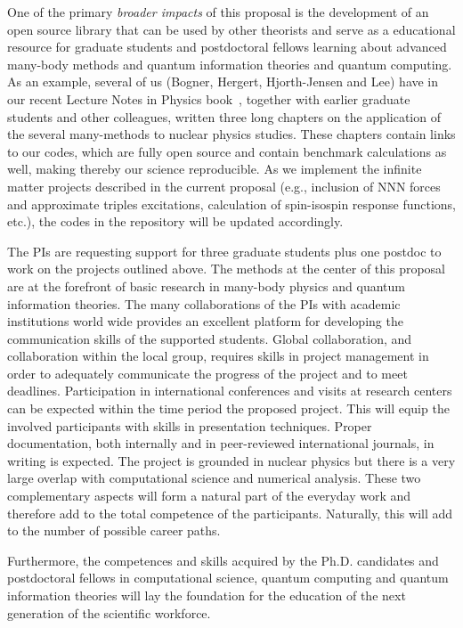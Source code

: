 \documentclass[10pt]{article}
\begin{document}
One of the primary \emph{broader impacts} of this proposal
is the development of an
open source library that can be used by other theorists and serve as a
educational resource for graduate students and postdoctoral fellows learning about
advanced many-body methods and quantum information theories and quantum computing.  As an example, several of us (Bogner, Hergert, Hjorth-Jensen and Lee) have in our recent Lecture
Notes in Physics book~\cite{lnp}, together with earlier graduate
students and other colleagues, written three long chapters on the
application of the several many-methods to nuclear physics studies. These
chapters contain links to our codes, which are fully open source and
contain benchmark calculations as well, making thereby our science
reproducible.  As
we implement the infinite matter projects described in the current
proposal (e.g., inclusion of NNN forces and approximate triples
excitations, calculation of spin-isospin response functions, etc.),
the codes in the repository will be updated accordingly.

The PIs are requesting support for three graduate students plus one
postdoc to work on the projects outlined above. The methods at the
center of this proposal are at the forefront of basic research in
many-body physics and quantum information theories. The many
collaborations of the PIs with academic institutions world wide
provides an excellent platform for developing the communication skills
of the supported students. Global collaboration, and collaboration
within the local group, requires skills in project management in order
to adequately communicate the progress of the project and to meet
deadlines. Participation in international conferences and visits at
research centers can be expected within the time period the proposed
project. This will equip the involved participants with skills in
presentation techniques.  Proper documentation, both internally and in
peer-reviewed international journals, in writing is expected. The
project is grounded in nuclear physics but there is a very large
overlap with computational science and numerical analysis. These two
complementary aspects will form a natural part of the everyday work
and therefore add to the total competence of the
participants. Naturally, this will add to the number of possible
career paths.

Furthermore, the competences and skills acquired by the Ph.D. candidates and postdoctoral fellows in computational science, quantum computing and quantum information theories will lay the foundation for the education of the next generation of the scientific workforce. 
\end{document}
